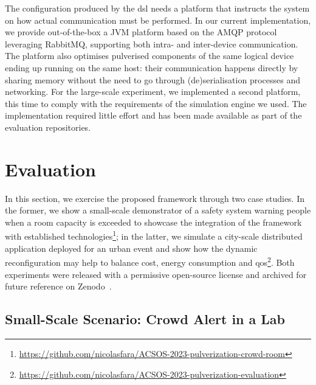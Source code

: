 \documentclass[conference]{IEEEtran}
\begin{document}
The configuration produced by the \ac{dsl} needs a platform that instructs the system on
how actual communication must be performed.
%
In our current implementation,
we provide out-of-the-box a JVM platform based on the AMQP protocol leveraging RabbitMQ,
supporting both intra- and inter-device communication.
%
The platform also optimises pulverised components of the same logical device ending up running on the same host:
their communication happens directly by sharing memory
without the need to go through (de)serialisation processes and networking.
%
For the large-scale experiment,
we implemented a second platform,
this time to comply with the requirements of the simulation engine we used.
%
The implementation required little effort
and has been made available as part of the evaluation repositories.

\section{Evaluation}\label{sec:evaluation}

In this section,
we exercise the proposed framework through two case studies.
%
In the former,
we show a small-scale demonstrator of a safety system warning people when a room capacity is exceeded
to showcase the integration of the framework with established technologies\footnote{
    \url{https://github.com/nicolasfara/ACSOS-2023-pulverization-crowd-room}
};
in the latter,
we simulate a city-scale distributed application deployed for an urban event
and show how the dynamic reconfiguration may help to balance
cost, energy consumption and \ac{qos}\footnote{
    \url{https://github.com/nicolasfara/ACSOS-2023-pulverization-evaluation}
}.
%
Both experiments were released with a permissive open-source license and archived for future reference on
Zenodo~\cite{https://doi.org/10.5281/zenodo.7933160, https://doi.org/10.5281/zenodo.7948801}.

\subsection{Small-Scale Scenario: Crowd Alert in a Lab}
\label{sec:small-scale-crowd-alert}
\end{document}

